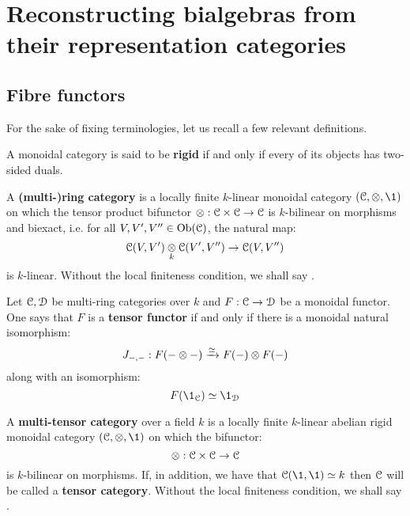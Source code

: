     \section{Reconstructing bialgebras from their representation categories}
        \subsection{Fibre functors}
            For the sake of fixing terminologies, let us recall a few relevant definitions.
            \begin{definition} \label{def: rigid_monoidal_categories}
                A monoidal category is said to be \textbf{rigid} if and only if every of its objects has two-sided duals. 
            \end{definition}
            \begin{definition} \label{def: ring_categories}
                \cite[Definition 4.1.1]{EGNO} A \textbf{(multi-)ring category} is a locally finite $k$-linear monoidal category $(\C, \tensor, \1)$ on which the tensor product bifunctor $\tensor: \C \x \C \to \C$ is $k$-bilinear on morphisms and biexact, i.e. for all $V, V', V'' \in \mathrm{Ob}(\mathcal{C})$, the natural map:
                    $$\C(V, V') \tensor_k \C(V', V'') \to \C(V, V'')$$
                is $k$-linear. Without the local finiteness condition, we shall say .
            \end{definition}
            \begin{definition} \label{def: tensor_functors}
                Let $\mathcal{C}, \mathcal{D}$ be multi-ring categories over $k$ and $F: \mathcal{C} \to \mathcal{D}$ be a monoidal functor. One says that $F$ is a \textbf{tensor functor} if and only if there is a monoidal natural isomorphism:
                    $$J_{-, -}: F(- \tensor -) \xrightarrow[]{\cong} F(-) \tensor F(-)$$
                along with an isomorphism:
                    $$F(\1_{\C}) \cong \1_{\D}$$
            \end{definition}
            \begin{definition} \label{def: tensor_categories}
                \cite[Definition 4.1.1]{EGNO} A  \textbf{multi-tensor category} over a field $k$ is a locally finite $k$-linear abelian rigid monoidal category $(\C, \tensor, \1)$ on which the bifunctor:
                    $$\tensor: \C \x \C \to \C$$
                is $k$-bilinear on morphisms. If, in addition, we have that $\C(\1, \1) \cong k$ then $\mathcal{C}$ will be called a \textbf{tensor category}. Without the local finiteness condition, we shall say .
            \end{definition}
